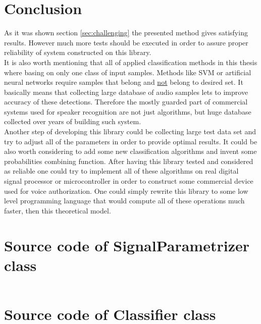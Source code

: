 \documentclass[magister]{dyplom}
\begin{document}
	\chapter{Conclusion}

	As it was shown section \ref{sec:challenging} the presented method gives satisfying results. However much more tests should be executed in order to assure proper reliability of system constructed on this library.\\
	
	It is also worth mentioning that all of applied classification methods in this thesis where basing on only one class of input samples. Methods like \gls{SVM} or artificial neural networks require samples that belong and \underline{not} belong to desired set. It basically means that collecting large database of audio samples lets to improve accuracy of these detections. Therefore the mostly guarded part of commercial systems used for speaker recognition are not just algorithms, but huge database collected over years of building such system.\\
	
	Another step of developing this library could be collecting large test data set and try to adjust all of the parameters in order to provide optimal results. It could be also worth considering to add some new classification algorithms and invent some probabilities combining function. After having this library tested and considered as reliable one could try to implement all of these algorithms on real digital signal processor or microcontroller in order to construct some commercial device used for voice authorization. One could simply rewrite this library to some low level programming language that would compute all of these operations much faster, then this theoretical model.

	\appendixpage	
	\appendix
	
	\chapter{Source code of SignalParametrizer class} \label{ch:impl_signal_param}

	\inputminted[linenos=true]{python}{../automatic_speaker_recognition/src/processing/signalparametrizer.py}
	
	\chapter{Source code of Classifier class} \label{ch:impl_classifier}
	
	\inputminted[linenos=true]{python}{../automatic_speaker_recognition/src/processing/classifier.py}
	
	\nocite{*}
	
	
\end{document}
